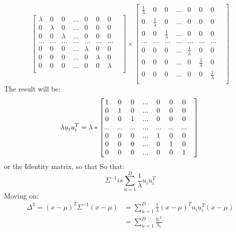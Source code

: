 \documentclass{article}
\begin{document}
        $$
            \begin{bmatrix}
                \lambda & 0 & 0 & ... & 0 & 0 & 0\\
                0 & \lambda & 0 & ... & 0 & 0 & 0\\
                0 & 0 & \lambda & ... & 0 & 0 & 0\\
                ...&...&...&...&...&...&...&\\
                0 & 0 & 0 & ... & \lambda & 0 & 0\\
                0 & 0 & 0 & ... & 0 & \lambda & 0\\
                0 & 0 & 0 & ... & 0 & 0 & \lambda\\
            \end{bmatrix} \times \begin{bmatrix}
                \frac{1}{\lambda} & 0 & 0 & ... & 0 & 0 & 0\\
                0 & \frac{1}{\lambda} & 0 & ... & 0 & 0 & 0\\
                0 & 0 & \frac{1}{\lambda} & ... & 0 & 0 & 0\\
                ...&...&...&...&...&...&...&\\
                0 & 0 & 0 & ... & \frac{1}{\lambda} & 0 & 0\\
                0 & 0 & 0 & ... & 0 & \frac{1}{\lambda} & 0\\
                0 & 0 & 0 & ... & 0 & 0 & \frac{1}{\lambda}\\
            \end{bmatrix}
        $$
        The result will be:
        $$
            \lambda u_i u_i^T = \lambda *
            \begin{bmatrix}
                1 & 0 & 0 & ... & 0 & 0 & 0\\
                0 & 1 & 0 & ... & 0 & 0 & 0\\
                0 & 0 & 1 & ... & 0 & 0 & 0\\
                ...&...&...&...&...&...&...&\\
                0 & 0 & 0 & ... & 1 & 0 & 0\\
                0 & 0 & 0 & ... & 0 & 1 & 0\\
                0 & 0 & 0 & ... & 0 & 0 & 1\\
            \end{bmatrix} \\
        $$
        or the Identity matrix, so that
        So that:
        $$
             \Sigma ^{-1} is \sum_{n=1}^{D} \frac{1}{\lambda} u_i u_i^T
        $$
        Moving on:
        \begin{equation}
            \begin{split}
                \Delta ^2 = (x - \mu)^T \Sigma ^{-1} (x - \mu) & = \sum_{n=1}^{D} \frac{1}{\lambda} (x - \mu)^T u_i u_i^T (x - \mu) \\
                & = \sum_{n=1}^{D} \frac{{y_i}^2}{\lambda_i}
            \end{split}
        \end{equation}\\
\end{document}
